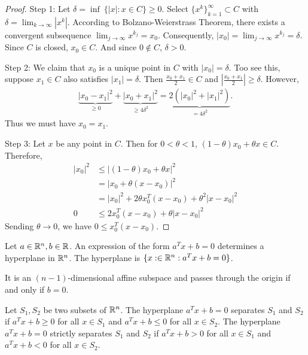 \begin{proof}
Step 1:
Let $\delta = \inf \ \{ |x| : x \in C \} \ge 0$.
Select $\{ x^k \}_{k=1}^{\infty} \subset C$ with $\delta = \lim _{k \to \infty} |x^k|$.
According to Bolzano-Weierstrass Theorem, there exists a convergent subsequence $\lim _{j \to \infty} x^{k_j} = x_0$.
Consequently, $|x_0| = \lim _{j \to \infty} x^{k_j} = \delta$.
Since $C$ is closed, $x_0 \in C$.
And since $0 \notin C$, $\delta > 0$.

Step 2:
We claim that $x_0$ is a unique point in $C$ with $|x_0| = \delta$.
Too see this, suppose $x_1 \in C$  also satisfies $|x_1| = \delta$. Then $\frac{x_0 + x_1}{2} \in C$ and $\left|\frac{x_0 + x_1}{2}\right| \ge \delta$.
However,
\begin{align}
\underbrace{|x_0 - x_1|^2}_{\ge 0} + \underbrace{|x_0 + x_1|^2}_{\ge 4 \delta^2} = \underbrace{2 (|x_0|^2 + |x_1|^2)}_{=4 \delta^2}.
\end{align}
Thus we must have $x_0 = x_1$.

Step 3:
Let $x$ be any point in $C$.
Then for $0 < \theta < 1$, $(1-\theta) x_0 + \theta x \in C$.
Therefore,
\begin{align}
|x_0|^2 & \le |(1-\theta) x_0 + \theta x|^2 \\
        & = |x_0 + \theta (x-x_0)|^2 \\
        & = |x_0|^2 + 2 \theta x_0^T (x-x_0) + \theta ^2 |x-x_0|^2 \\
0       & \le 2 x_0^T (x-x_0) + \theta |x-x_0|^2
\end{align}
Sending $\theta \to 0$, we have $0 \le x_0 ^T (x-x_0)$.
\end{proof}

\begin{definition}[Hyperplane]
Let $a \in \mathbb{R}^n, b \in \mathbb{R}$.
An expression of the form $a^T x + b = 0$ determines a hyperplane in $\mathbb{R}^n$.
The hyperplane is $\{ x : \in \mathbb{R}^n : a^T x + b = 0 \}$.
\end{definition}

It is an $(n-1)$-dimensional affine subspace and passes through the origin if and only if $b = 0$.

\begin{definition}
Let $S_1, S_2$ be two subsets of $\mathbb{R}^n$.
The hyperplane $a^T x + b = 0$ separates $S_1$ and $S_2$ if $a^T x + b \ge 0$ for all $x \in S_1$ and $a^T x + b \le 0$ for all $x \in S_2$.
The hyperplane $a^T x + b = 0$ strictly separates $S_1$ and $S_2$ if $a^T x + b > 0$ for all $x \in S_1$ and $a^T x + b < 0$ for all $x \in S_2$.
\end{definition}


